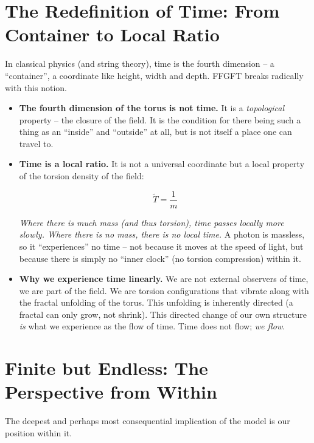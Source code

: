 	\section{The Redefinition of Time: From Container to Local Ratio}
	
	In classical physics (and string theory), time is the fourth dimension -- a ``container'', a coordinate like height, width and depth. FFGFT breaks radically with this notion.
	
	\begin{itemize}
		\item \textbf{The fourth dimension of the torus is not time.} It is a \textit{topological} property -- the closure of the field. It is the condition for there being such a thing as an ``inside'' and ``outside'' at all, but is not itself a place one can travel to.
		
		\item \textbf{Time is a local ratio.} It is not a universal coordinate but a local property of the torsion density of the field:
		
		\begin{equation}
			\tilde{T} = \frac{1}{m}
			\label{eq:time}
		\end{equation}
		
		\textit{Where there is much mass (and thus torsion), time passes locally more slowly. Where there is no mass, there is no local time.} A photon is massless, so it ``experiences'' no time -- not because it moves at the speed of light, but because there is simply no ``inner clock'' (no torsion compression) within it.
		
		\item \textbf{Why we experience time linearly.} We are not external observers of time, we are part of the field. We are torsion configurations that vibrate along with the fractal unfolding of the torus. This unfolding is inherently directed (a fractal can only grow, not shrink). This directed change of our own structure \textit{is} what we experience as the flow of time. Time does not flow; \textit{we flow}.
	\end{itemize}
	
	\section{Finite but Endless: The Perspective from Within}
	
	The deepest and perhaps most consequential implication of the model is our position within it.
	
